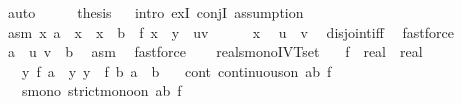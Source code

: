 \begin{isabellebody}
\ auto\isanewline
\ \ \isamarkupfalse%
\ \isamarkupfalse%
\ {\isacharquery}{\kern0pt}thesis\isanewline
\ \ \isamarkupfalse%
{\isacharparenleft}{\kern0pt}intro\ exI\ conjI{\isacharcomma}{\kern0pt}\ assumption{\isacharparenright}{\kern0pt}\isanewline
\ \ \ \ \isamarkupfalse%
\ asm{\isacharcolon}{\kern0pt}\ {\isachardoublequoteopen}{\isacharbraceleft}{\kern0pt}x{\isachardot}{\kern0pt}\ a\ {\isasymle}\ x\ {\isasymand}\ x\ {\isasymle}\ b\ {\isasymand}\ f\ x\ {\isacharequal}{\kern0pt}\ y{\isacharbraceright}{\kern0pt}\ {\isacharequal}{\kern0pt}\ {\isacharbraceleft}{\kern0pt}u{\isachardot}{\kern0pt}{\isachardot}{\kern0pt}v{\isacharbraceright}{\kern0pt}{\isachardoublequoteclose}\isanewline
\ \ \ \ \isamarkupfalse%
\ x\ \isamarkupfalse%
\ {\isachardoublequoteopen}u\ {\isasymle}\ v{\isachardoublequoteclose}\ \isamarkupfalse%
\ disjoint{\isacharunderscore}{\kern0pt}iff\ \isamarkupfalse%
\ fastforce\isanewline
\ \ \ \ \isamarkupfalse%
\ \isamarkupfalse%
\ {\isachardoublequoteopen}a\ {\isasymle}\ u{\isachardoublequoteclose}\ {\isachardoublequoteopen}v\ {\isasymle}\ b{\isachardoublequoteclose}\ \isamarkupfalse%
\ asm\ \isamarkupfalse%
\ fastforce{\isacharplus}{\kern0pt}\isanewline
\ \ \isamarkupfalse%
\isanewline
{}\isamarkupfalse%
%
\endisatagproof
{\isafoldproof}%
%
\isadelimproof
\isanewline
%
\endisadelimproof
\isanewline
{}\isamarkupfalse%
\ real{\isacharunderscore}{\kern0pt}smono{\isacharunderscore}{\kern0pt}IVT{\isacharprime}{\kern0pt}{\isacharunderscore}{\kern0pt}set{\isacharcolon}{\kern0pt}\isanewline
\ \ \ f\ {\isacharcolon}{\kern0pt}{\isacharcolon}{\kern0pt}\ {\isachardoublequoteopen}real\ {\isasymRightarrow}\ real{\isachardoublequoteclose}\isanewline
\ \ \ y{\isacharcolon}{\kern0pt}\ {\isachardoublequoteopen}f\ a\ {\isasymle}\ y{\isachardoublequoteclose}\ {\isachardoublequoteopen}y\ {\isasymle}\ f\ b{\isachardoublequoteclose}\ {\isachardoublequoteopen}a\ {\isasymle}\ b{\isachardoublequoteclose}\isanewline
\ \ \ cont{\isacharcolon}{\kern0pt}\ {\isachardoublequoteopen}continuous{\isacharunderscore}{\kern0pt}on\ {\isacharbraceleft}{\kern0pt}a{\isachardot}{\kern0pt}{\isachardot}{\kern0pt}b{\isacharbraceright}{\kern0pt}\ f{\isachardoublequoteclose}\isanewline
\ \ \ smono{\isacharcolon}{\kern0pt}\ {\isachardoublequoteopen}strict{\isacharunderscore}{\kern0pt}mono{\isacharunderscore}{\kern0pt}on\ {\isacharbraceleft}{\kern0pt}a{\isachardot}{\kern0pt}{\isachardot}{\kern0pt}b{\isacharbraceright}{\kern0pt}\ f{\isachardoublequoteclose}\isanewline

\end{isabellebody}
